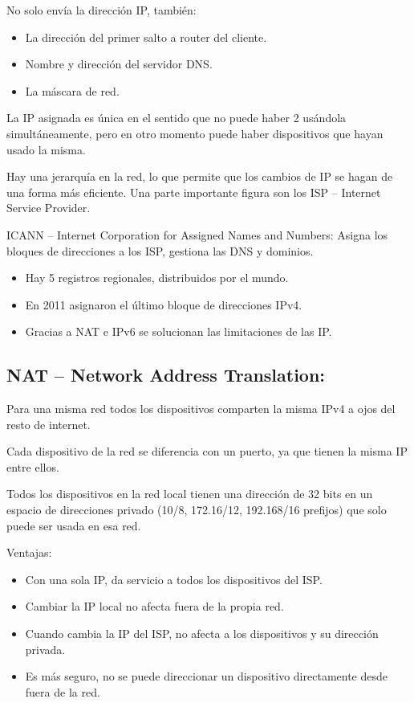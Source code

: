 \documentclass[12pt, twoside, openright]{report} %
\begin{document}
No solo envía la dirección IP, también:

\begin{itemize}
	\item La dirección del primer salto a router del cliente.
	\item Nombre y dirección del servidor DNS.
	\item La máscara de red.
\end{itemize}

La IP asignada es única en el sentido que no puede haber 2 usándola
simultáneamente, pero en otro momento puede haber dispositivos que
hayan usado la misma.

Hay una jerarquía en la red, lo que permite que los cambios de IP se
hagan de una forma más eficiente. Una parte importante figura son los
ISP -- Internet Service Provider.

ICANN -- Internet Corporation for Assigned Names and Numbers: Asigna
los bloques de direcciones a los ISP, gestiona las DNS y dominios.

\begin{itemize}
	\item Hay 5 registros regionales, distribuidos por el mundo.
	\item En 2011 asignaron el último bloque de direcciones IPv4.
	\item Gracias a NAT e IPv6 se solucionan las limitaciones de las IP.
\end{itemize}


\subsection{NAT -- Network Address
	Translation:}


Para una misma red todos los dispositivos comparten la misma IPv4 a
ojos del resto de internet.

Cada dispositivo de la red se diferencia con un puerto, ya que tienen
la misma IP entre ellos.

Todos los dispositivos en la red local tienen una dirección de 32 bits
en un espacio de direcciones privado (10/8, 172.16/12, 192.168/16
prefijos) que solo puede ser usada en esa red.

Ventajas:

\begin{itemize}
	\item Con una sola IP, da servicio a todos los dispositivos del ISP.
	\item Cambiar la IP local no afecta fuera de la propia red.
	\item Cuando cambia la IP del ISP, no afecta a los dispositivos y su
	      dirección privada.
	\item Es más seguro, no se puede direccionar un dispositivo directamente
	      desde fuera de la red.
\end{itemize}
\end{document}
